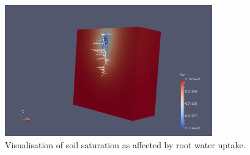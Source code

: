 \begin{figure}[ht]
	\centering
  \includegraphics[width=0.8\textwidth]{RWU.png}
	\captionsetup{labelformat=empty}
	\caption{Visualisation of soil saturation as affected by root water uptake.}
	\label{RWU}
\end{figure}


